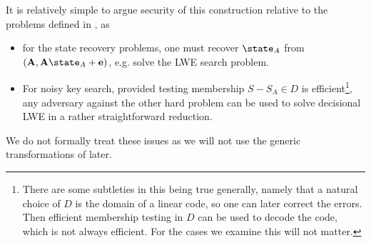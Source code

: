 It is relatively simple to argue security of this construction relative to the problems defined in \cite{EPRINT:SzeReyPre18}, as
\begin{itemize}
	\item for the state recovery problems, one must recover $\state_A$ from $(\mfont{A}, \mfont{A}\state_A + \vfont{e})$, e.g. solve the LWE search problem.
	\item For noisy key search, provided testing membership $S - S_A\in D$ is efficient\footnote{There are some subtleties in this being true generally, namely that a natural choice of $D$ is the domain of a linear code, so one can later correct the errors.
	Then efficient membership testing in $D$ can be used to decode the code, which is not always efficient.
	For the cases we examine this will not matter.}, any adversary against the other hard problem can be used to solve decisional LWE in a rather straightforward reduction.
\end{itemize}
We do not formally treat these issues as we will not use the generic transformations of \cite{EPRINT:SzeReyPre18} later.